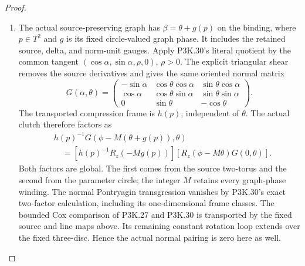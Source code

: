 \begin{proof}
\begin{enumerate}[label=\arabic*.]
\par\medskip\noindent\textbf{The full normal frame and the primitive sector.}
We finish with the actual P3K.30 normal comparison,
retaining the added unit. In radian coordinates,
the page phase on the ordinary part is
\[
 \arg P=M\varepsilon\gamma+\arg(t-\tau)
       -\varepsilon m_\infty n_0\arg t
       -\varepsilon M\arg u(t).
\]
Near the regular binding choose the literal
holomorphic coordinate
\[
 q_b=(t-\tau)(t/\tau)^{-\varepsilon m_\infty n_0}
                  (u(t)/u(\tau))^{-\varepsilon M}.      \tag{K32.26}
\]
Its derivative at $\tau$ is one. Every exponent
is an integer, and each other factor is a
specified extending unit. Retain the constant
phases of $\tau$ and $u(\tau)$ in the page
angle $\phi$. Then (K32.26) gives exactly
$\alpha=\phi-M\beta$, with
$\beta=\varepsilon\gamma$. In a one-cap chart
the $t/\tau$ factor is absent. This coordinate
retains the variable added phase throughout
the binding neighbourhood.

\item The actual source-preserving graph has
$\beta=\theta+g(p)$ on the binding, where
$p\in T^2$ and $g$ is its fixed circle-valued
graph phase. It includes the retained source,
delta, and norm-unit gauges. Apply P3K.30's
literal quotient by the common tangent
$(\cos\alpha,\sin\alpha,\rho,0)$, $\rho>0$.
The explicit triangular shear removes the
source derivatives and gives the same oriented
normal matrix
\[
 G(\alpha,\theta)=
 \begin{pmatrix}
 -\sin\alpha&\cos\theta\cos\alpha&\sin\theta\cos\alpha\\
 \cos\alpha&\cos\theta\sin\alpha&\sin\theta\sin\alpha\\
 0&\sin\theta&-\cos\theta
 \end{pmatrix}.                                      \tag{K32.27}
\]
The transported compression frame is $h(p)$,
independent of $\theta$. The actual clutch
therefore factors as
\[
 \begin{split}
 &h(p)^{-1}G(\phi-M(\theta+g(p)),\theta)\\
 &\quad=[h(p)^{-1}R_z(-Mg(p))]
           [R_z(\phi-M\theta)G(0,\theta)].             
 \end{split}\tag{K32.28}
\]
Both factors are global. The first comes from
the source two-torus and the second from the
parameter circle; the integer $M$ retains every
graph-phase winding. The normal Pontryagin
transgression vanishes by P3K.30's exact
two-factor calculation, including its
one-dimensional frame classes. The bounded
Cox comparison of P3K.27 and P3K.30 is
transported by the fixed source and line maps
above. Its remaining constant rotation loop
extends over the fixed three-disc. Hence the
actual normal pairing is zero here as well.


\end{enumerate}
\end{proof}
